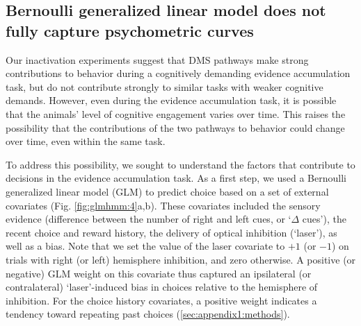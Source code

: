 \subsection{Bernoulli generalized linear model does not fully capture psychometric curves}
\label{sec:glmhmm:2.2.6}

Our inactivation experiments suggest that DMS pathways make strong contributions to behavior during a cognitively demanding evidence accumulation task, but do not contribute strongly to similar tasks with weaker cognitive demands. However, even during the evidence accumulation task, it is possible that the animals’ level of cognitive engagement varies over time. This raises the possibility that the contributions of the two pathways to behavior could change over time, even within the same task.

To address this possibility, we sought to understand the factors that contribute to decisions in the evidence accumulation task. As a first step, we used a Bernoulli generalized linear model (GLM) to predict choice based on a set of external covariates (Fig. \ref{fig:glmhmm:4}a,b). These covariates included the sensory evidence (difference between the number of right and left cues, or ‘$\Delta$ cues’), the recent choice and reward history, the delivery of optical inhibition (‘laser’), as well as a bias. Note that we set the value of the laser covariate to $+1$ (or $-1$) on trials with right (or left) hemisphere inhibition, and zero otherwise. A positive (or negative) GLM weight on this covariate thus captured an ipsilateral (or contralateral) ‘laser’-induced bias in choices relative to the hemisphere of inhibition. For the choice history covariates, a positive weight indicates a tendency toward repeating past choices (\ref{sec:appendix1:methods}).

